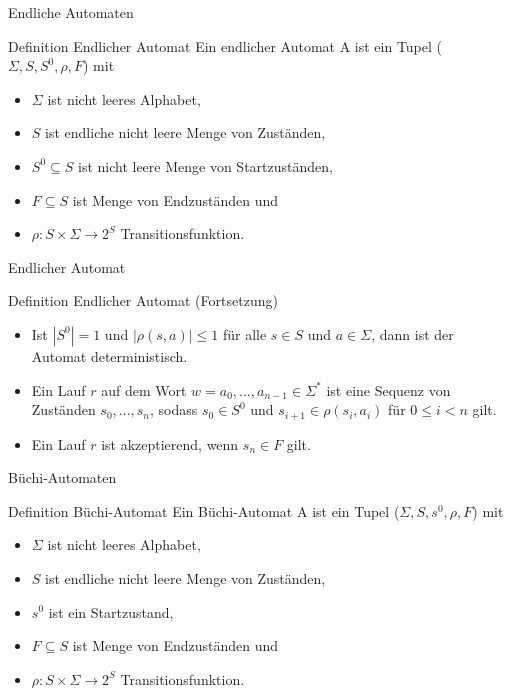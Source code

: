 \begin{frame}{Endliche Automaten}
\begin{block}{Definition Endlicher Automat}
Ein endlicher Automat A ist ein Tupel ($\Sigma, S, S^0, \rho, F$) mit
\begin{itemize}
\item $\Sigma$ ist nicht leeres Alphabet,
\item $S$ ist endliche nicht leere Menge von Zuständen,
\item $S^0\subseteq S$ ist nicht leere Menge von Startzuständen,
\item $F\subseteq S$ ist Menge von Endzuständen und
\item $\rho : S \times \Sigma \rightarrow 2^S$ Transitionsfunktion.
\end{itemize}
\end{block}
\end{frame}

\begin{frame}{Endlicher Automat}
\begin{block}{Definition Endlicher Automat (Fortsetzung)}
\begin{itemize}
\item Ist $|S^0|=1$ und $|\rho(s,a)|\leq 1$ für alle $s\in S$ und $a\in \Sigma$, dann ist der Automat deterministisch.
\item Ein Lauf $r$ auf dem Wort $w=a_0,...,a_{n-1}\in \Sigma^\ast$ ist eine Sequenz von Zuständen $s_0,...,s_n$, sodass $s_0\in S^0$ und $s_{i+1}\in \rho(s_i,a_i)$ für $0\leq i < n$ gilt.
\item Ein Lauf $r$ ist akzeptierend, wenn $s_n\in F$ gilt.
\end{itemize}
\end{block}
\end{frame}

\begin{frame}{Büchi-Automaten}
\begin{block}{Definition Büchi-Automat}
Ein Büchi-Automat A ist ein Tupel ($\Sigma, S, s^0, \rho, F$) mit
\begin{itemize}
\item $\Sigma$ ist nicht leeres Alphabet,
\item $S$ ist endliche nicht leere Menge von Zuständen,
\item $s^0$ ist ein Startzustand,
\item $F\subseteq S$ ist Menge von Endzuständen und
\item $\rho : S \times \Sigma \rightarrow 2^S$ Transitionsfunktion.
\end{itemize}
\end{block}
\end{frame}


